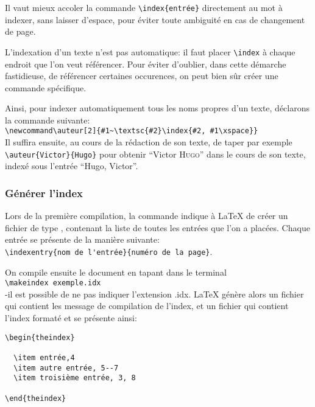 \begin{attention}
Il vaut mieux accoler la commande \verb+\index{entrée}+ directement au  mot à indexer, sans laisser d'espace, pour éviter toute ambiguité en cas de changement de page.

\end{attention}

L'indexation d'un texte n'est pas automatique: il faut placer \verb+\index+ à chaque endroit  que l'on veut référencer. Pour éviter d'oublier, dans cette démarche fastidieuse, de référencer certaines occurences, on  peut bien sûr créer une commande  spécifique.

Ainsi, pour indexer automatiquement tous les noms propres d'un texte, déclarons la commande suivante:\\
 \verb+\newcommand\auteur[2]{#1~\textsc{#2}\index{#2, #1\xspace}}+\\
Il suffira ensuite, au cours de la rédaction de son texte, de taper par exemple \verb|\auteur{Victor}{Hugo}| pour obtenir \enquote{Victor \textsc{Hugo}} dans le cours de son texte, indexé sous l'entrée \enquote{Hugo, Victor}.


\subsubsection{Générer l'index}


 Lors de la première compilation, la commande  indique à \LaTeX{} de créer un fichier de type , contenant la liste de toutes les entrées que l'on a placées. Chaque entrée se présente de la manière suivante:\\
\verb+\indexentry{nom de l'entrée}{numéro de la page}+.



On compile ensuite le document en tapant dans le terminal \\ \verb+\makeindex exemple.idx + \\
-il est possible de ne pas indiquer l'extension .idx. \LaTeX{} génère alors un fichier  qui contient les message de compilation de l'index, et un fichier  qui contient l'index formaté et se présente ainsi:


\begin{verbatim}
\begin{theindex}

  \item entrée,4
  \item autre entrée, 5--7
  \item troisième entrée, 3, 8	

\end{theindex} 

\end{verbatim}

